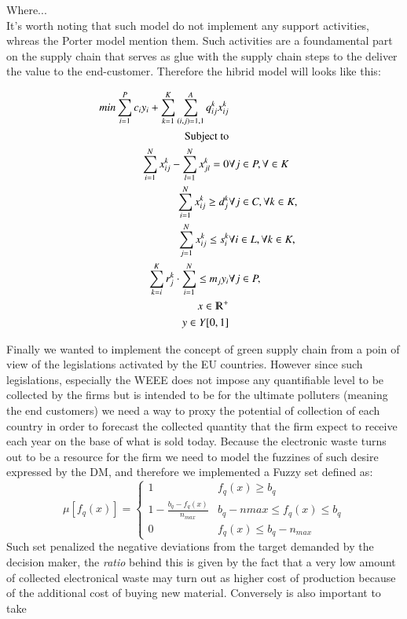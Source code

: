 \documentclass{article}
\begin{document}
Where...
\\
It's worth noting that such model do not implement any support activities, whreas the Porter model mention them. Such activities are a foundamental part on the supply chain that serves as glue with the supply chain steps to the deliver the value to the end-customer. Therefore the hibrid model will looks like this:

\begin{equation*}
\begin{aligned}
	min \sum_{i=1}^{P} c_i y_i  + \sum_{k=1}^{K} \sum_{(i,j)=1,1}^{A} q_{ij}^{k}x_{ij}^{k}
  \\
  \text{Subject to}
  \\
  \sum_{i=1}^{N} x_{ij}^k - \sum_{l=1}^{N} x_{jl}^k = 0 & \forall j \in P, \forall \in K
  \\
  \sum_{i=1}^{N} x_{ij}^k \geq d_{j}^k & \forall j \in C, \forall k \in K,
  \\
  \sum_{j=1}^{N} x_{ij}^{k} \leq s_{i}^{k}  & \forall i \in L, \forall k \in K,
  \\
  \sum_{k=i}^{K} r_{j}^k \cdot \sum_{i=1}^{N} \leq m_j y_i & \forall j \in P,
  \\
  x \in \varmathbb{R}^+
  \\
  y \in Y[0,1] \\
\end{aligned}
\end{equation*}

Finally we wanted to implement the concept of green supply chain from a poin of view of the legislations activated by the EU countries. However since such legislations, especially the WEEE does not impose any quantifiable level to be collected by the firms but is intended to be for the ultimate polluters (meaning the end customers) we need a way to proxy the potential of collection of each country in order to forecast the collected quantity that the firm expect to receive each year on the base of what is sold today. Because the electronic waste turns out to be a resource for the firm we need to model the fuzzines of such desire expressed by the DM, and therefore we implemented a Fuzzy set\cite{} defined as:
$$
\mu [f_q(x)]=
\begin{cases}
1 & f_q(x) \geq b_q \\
1-\frac{b_q-f_q(x)}{n_{max}} & b_q -n{max} \leq f_q(x) \leq b_q \\
0 & f_q(x) \leq b_q - n_{max}
\end{cases}
$$
Such set penalized the negative deviations from the target demanded by the decision maker, the \textit{ratio} behind this is given by the fact that a very low amount of collected electronical waste may turn out as higher cost of production because of the additional cost of buying new material. Conversely is also important to take
\end{document}
